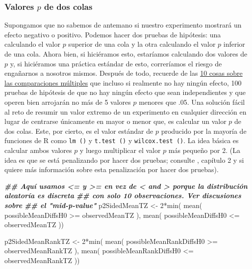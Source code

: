 \documentclass[
]{article}
\newenvironment{Shaded}{\begin{snugshade}}{\end{snugshade}}
\newcommand{\DecValTok}[1]{\textcolor[rgb]{0.00,0.00,0.81}{#1}}
\newcommand{\DocumentationTok}[1]{\textcolor[rgb]{0.56,0.35,0.01}{\textbf{\textit{#1}}}}
\newcommand{\FunctionTok}[1]{\textcolor[rgb]{0.00,0.00,0.00}{#1}}
\newcommand{\NormalTok}[1]{#1}
\newcommand{\OtherTok}[1]{\textcolor[rgb]{0.56,0.35,0.01}{#1}}
\newcommand{\SpecialCharTok}[1]{\textcolor[rgb]{0.00,0.00,0.00}{#1}}
\begin{document}
\hypertarget{valores-p-de-dos-colas}{%
\subsubsection{\texorpdfstring{Valores \(p\) de dos colas}{Valores p de dos colas}}\label{valores-p-de-dos-colas}}

Supongamos que no sabemos de antemano si nuestro experimento mostrará un efecto negativo o positivo. Podemos hacer dos pruebas de hipótesis: una calculando el valor \(p\) superior de una cola y la otra calculando el valor \(p\) inferior de una cola. Ahora bien, si hiciéramos esto, estaríamos calculando dos valores de \(p\) y, si hiciéramos una práctica estándar de esto, correríamos el riesgo de engañarnos a nosotros mismos. Después de todo, recuerde de las \href{https://egap.org/resource/10-things-to-know-about-multiple-comparisons}{10 cosas sobre las comparaciones múltiples} que incluso si realmente no hay ningún efecto, 100 pruebas de hipótesis de que no hay ningún efecto que sean independientes y que operen bien arrojarán no más de 5 valores \(p\) menores que .05. Una solución fácil al reto de resumir un valor extremo de un experimento en cualquier dirección en lugar de centrarse únicamente en mayor o menor que, es calcular un valor \(p\) de dos colas. Este, por cierto, es el valor estándar de \(p\) producido por la mayoría de funciones de R como \texttt{lm\ ()} y \texttt{t.test\ ()} y \texttt{wilcox.test\ ()}. La idea básica es calcular ambos valores \(p\) y luego multiplicar el valor \(p\) más pequeño por 2. (La idea es que se está penalizando por hacer dos pruebas; consulte \textcite{rosenbaum2010design}, capítulo 2 y \textcite{cox1977role} si quiere más información sobre esta penalización por hacer dos pruebas).

\begin{Shaded}
\begin{Highlighting}[]
\DocumentationTok{\#\# Aquí usamos \textless{}= y \textgreater{}= en vez de \textless{} and \textgreater{} porque la distribución aleatoría es discreta }
\DocumentationTok{\#\# con solo  10 observaciones. Ver discusiones sobre}
\DocumentationTok{\#\# el "mid{-}p{-}value" }
\NormalTok{p2SidedMeanTZ }\OtherTok{\textless{}{-}}     \DecValTok{2}\SpecialCharTok{*}\FunctionTok{min}\NormalTok{( }\FunctionTok{mean}\NormalTok{( possibleMeanDiffsH0 }\SpecialCharTok{\textgreater{}=}\NormalTok{ observedMeanTZ ),}
               \FunctionTok{mean}\NormalTok{( possibleMeanDiffsH0 }\SpecialCharTok{\textless{}=}\NormalTok{ observedMeanTZ ))}

\NormalTok{p2SidedMeanRankTZ }\OtherTok{\textless{}{-}} \DecValTok{2}\SpecialCharTok{*}\FunctionTok{min}\NormalTok{( }\FunctionTok{mean}\NormalTok{( possibleMeanRankDiffsH0 }\SpecialCharTok{\textgreater{}=}\NormalTok{ observedMeanRankTZ ),}
\FunctionTok{mean}\NormalTok{( possibleMeanRankDiffsH0 }\SpecialCharTok{\textless{}=}\NormalTok{ observedMeanRankTZ ))}
\end{Highlighting}
\end{Shaded}
\end{document}
